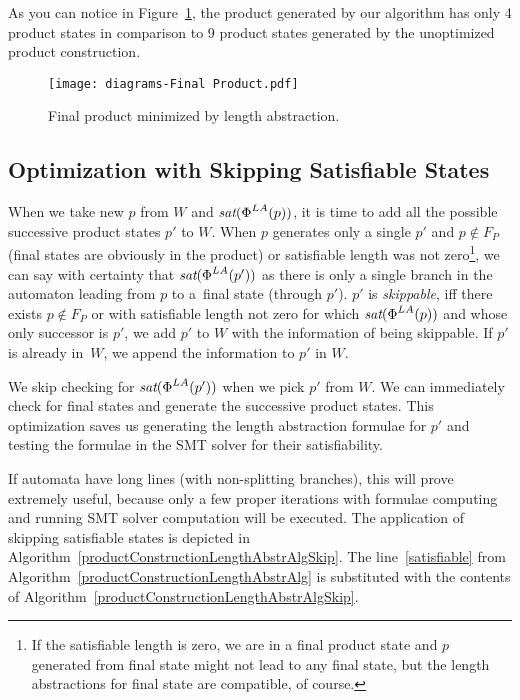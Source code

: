 As you can notice in Figure~\ref{fig:product_final}, the product generated by our algorithm has only 4 product states in comparison to 9 product states generated by the unoptimized product construction.

\begin{figure}[ht]
	\centering
	\texttt{[image: diagrams-Final Product.pdf]}
	\caption{Final product minimized by length abstraction.}
	\label{fig:product_final}
\end{figure}


\subsection{Optimization with Skipping Satisfiable States} \label{sec:skipping states}

When we take new $p$ from $W$ and $\emph{sat}(\emph{$\Phi$}^{LA}(p))$, it is time to add all the possible successive product states $p'$ to $W$. When $p$ generates only a single $p'$ and $p \not \in F_P$ (final states are obviously in the product) or satisfiable length was not zero\footnote{If the satisfiable length is zero, we are in a final product state and $p$ generated from final state might not lead to any final state, but the length abstractions for final state are compatible, of course.}, we can say with certainty that $\emph{sat}(\emph{$\Phi$}^{LA}(p'))$ as there is only a single branch in the automaton leading from $p$ to a~final state (through $p'$). $p'$ is \emph{skippable}, iff there exists $p \not \in F_P$ or with satisfiable length not zero for which $\emph{sat}(\emph{$\Phi$}^{LA}(p))$ and whose only successor is $p'$, we add $p'$ to $W$ with the information of being skippable. If $p'$ is already in~$W$, we append the information to $p'$ in $W$.

We skip checking for $\emph{sat}(\emph{$\Phi$}^{LA}(p'))$ when we pick $p'$ from $W$. We can immediately check for final states and generate the successive product states. This optimization saves us generating the length abstraction formulae for $p'$ and testing the formulae in the SMT solver for their satisfiability.

If automata have long lines (with non-splitting branches), this will prove extremely useful, because only a few proper iterations with formulae computing and running SMT solver computation will be executed. The application of skipping satisfiable states is depicted in Algorithm~\ref{productConstructionLengthAbstrAlgSkip}. The line~\ref{satisfiable} from Algorithm~\ref{productConstructionLengthAbstrAlg} is substituted with the contents of Algorithm~\ref{productConstructionLengthAbstrAlgSkip}.

